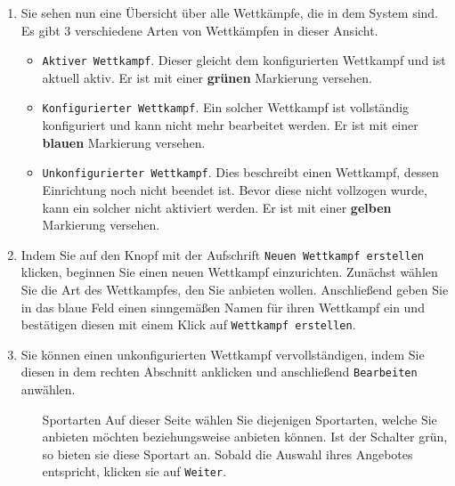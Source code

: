 \documentclass[11pt,a4paper,titlepage,german]{article}
\begin{document}
\begin{enumerate}
				\item {}
					Sie sehen nun eine Übersicht über alle Wettkämpfe, die in dem System sind. Es gibt 3 verschiedene Arten von Wettkämpfen in dieser Ansicht.
					\begin{itemize}
						\item \texttt{Aktiver Wettkampf}. Dieser gleicht dem konfigurierten Wettkampf und ist aktuell aktiv. Er ist mit einer \textbf{\color{CGreen}grünen} Markierung versehen.
						\item \texttt{Konfigurierter Wettkampf}. Ein solcher Wettkampf ist vollständig konfiguriert und kann nicht mehr bearbeitet werden. Er ist mit einer \textbf{\color{CBlue}blauen} Markierung versehen.
						\item \texttt{Unkonfigurierter Wettkampf}. Dies beschreibt einen Wettkampf, dessen Einrichtung noch nicht beendet ist. Bevor diese nicht vollzogen wurde, kann ein solcher nicht aktiviert werden. Er ist mit einer \textbf{\color{CYellow}gelben} Markierung versehen.
					\end{itemize}
				
				\item {}
					Indem Sie auf den Knopf mit der Aufschrift \texttt{Neuen Wettkampf erstellen} klicken, beginnen Sie einen neuen Wettkampf einzurichten. Zunächst wählen Sie die Art des Wettkampfes, den Sie anbieten wollen. Anschließend geben Sie in das blaue Feld einen sinngemäßen Namen für ihren Wettkampf ein und bestätigen diesen mit einem Klick auf \texttt{Wettkampf erstellen}.
				
				\item {}
					Sie können einen unkonfigurierten Wettkampf vervollständigen, indem Sie diesen in dem rechten Abschnitt anklicken und anschließend \texttt{Bearbeiten} anwählen.
				
					\begin{enumerate}
						\item[Sportarten] Auf dieser Seite wählen Sie diejenigen Sportarten, welche Sie anbieten möchten beziehungsweise anbieten können. Ist der Schalter grün, so bieten sie diese Sportart an. Sobald die Auswahl ihres Angebotes entspricht, klicken sie auf \texttt{Weiter}.
						

\end{enumerate}
\end{enumerate}
\end{document}
